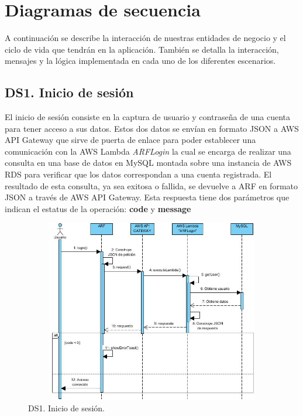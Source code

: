 \newpage
\section{Diagramas de secuencia}
A continuación se describe la interacción de nuestras entidades de negocio y el ciclo de vida que tendrán en la aplicación. También se detalla la interacción, mensajes y la lógica implementada en cada uno de los diferentes escenarios.\par

\subsection{DS1. Inicio de sesión}
El inicio de sesión consiste en la captura de usuario y contraseña de una cuenta para tener acceso a sus datos. Estos dos datos se envían en formato JSON a AWS API Gateway que sirve de puerta de enlace para poder establecer una comunicación con la AWS Lambda \textit{ARFLogin} la cual se encarga de realizar una consulta en una base de datos en MySQL montada sobre una instancia de AWS RDS para verificar que los datos correspondan a una cuenta registrada. El resultado de esta consulta, ya sea exitosa o fallida, se devuelve a ARF en formato JSON a través de AWS API Gateway. Esta respuesta tiene dos parámetros que indican el estatus de la operación: \textbf{code} y \textbf{message}

\begin{figure}[h!]
	\centering
	\includegraphics[width=14cm,height=8cm]{imagenes/analisis/ds/dsinicio_sesion.jpg}
	\caption{DS1. Inicio de sesión.}
	\label{fig:dsiniciosesion}
\end{figure}


